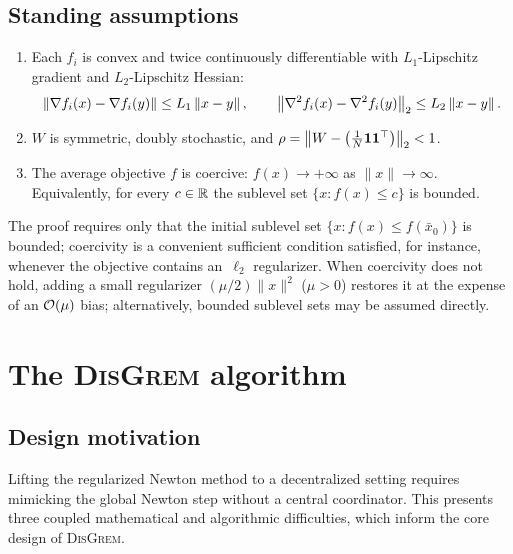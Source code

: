 \documentclass[review,onefignum,onetabnum]{siamart171218}
\begin{document}
	\subsection{Standing assumptions}
	\begin{assumption}\label{ass:standing}
		\begin{enumerate}[nosep,leftmargin=1em]
		\item Each $f_i$ is convex and twice continuously differentiable
		with $L_1$-Lipschitz gradient and $L_2$-Lipschitz Hessian:
			\[
			\left\|\nabla f_i(x)-\nabla f_i(y)\right\|\le L_1\left\|x-y\right\|,
			\qquad
			\left\|\nabla^2 f_i(x)-\nabla^2 f_i(y)\right\|_2\le L_2\left\|x-y\right\|.
			\]
			\item $W$ is symmetric, doubly stochastic, and $\rho=\left\|W-\left(\frac{1}{N}\mathbf{1}\mathbf{1}^\top\right)\right\|_2<1$.
		\item The average objective $f$ is coercive: $f(x)\to+\infty$ as $\|x\|\to\infty$.
			Equivalently, for every $c\in\mathbb{R}$ the sublevel set $\{x:f(x)\le c\}$ is bounded.
		\end{enumerate}
	\end{assumption}

	\begin{remark}
	The proof requires only that the initial sublevel set
	$\{x : f(x) \le f(\bar x_0)\}$ is bounded;
	coercivity is a convenient sufficient condition satisfied,
	for instance, whenever the objective contains an~$\ell_2$
	regularizer.
	When coercivity does not hold, adding a small regularizer
	$(\mu/2)\|x\|^2$ ($\mu>0$) restores it at the expense of an
	$\mathcal{O}(\mu)$ bias; alternatively, bounded sublevel sets may be
	assumed directly.
	\end{remark}

	
\section{The \textsc{DisGrem} algorithm}\label{sec:alg}
	
	\subsection{Design motivation}\label{ssec:design}

	Lifting the regularized Newton method to a decentralized setting
	requires mimicking the global Newton step without a central
	coordinator.
	This presents three coupled mathematical and algorithmic
	difficulties, which inform the core design of \textsc{DisGrem}.
\end{document}
